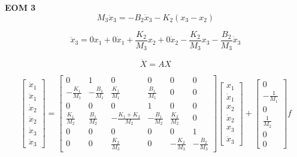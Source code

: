 \documentclass[letterpaper,11pt]{article}
\begin{document}
\noindent \textbf{EOM 3}
\[
M_3 \ddot{x}_3 = -B_2 \dot{x}_3 - K_2(x_3 - x_2)
\]

\[
\ddot{x}_3 = 0   x_1 + 0   \dot{x}_1 + \frac{K_2}{M_3} x_2 + 0   \dot{x}_2 - \frac{K_2}{M_3} x_3 - \frac{B_2}{M_3} \dot{x}_3
\]

\[
\dot{X} = A X
\]

\[
\begin{bmatrix}
\dot{x}_1 \\
\ddot{x}_1 \\
\dot{x}_2 \\
\ddot{x}_2 \\
\dot{x}_3 \\
\ddot{x}_3
\end{bmatrix}
=
\begin{bmatrix}
0 & 1 & 0 & 0 & 0 & 0 \\
-\frac{K_1}{M_1} & -\frac{B_1}{M_1} & \frac{K_1}{M_1} & \frac{B_1}{M_1} & 0 & 0 \\
0 & 0 & 0 & 1 & 0 & 0 \\
\frac{K_1}{M_2} & \frac{B_1}{M_2} & -\frac{K_1+K_2}{M_2} & -\frac{B_1}{M_2} & \frac{K_2}{M_2} & 0 \\
0 & 0 & 0 & 0 & 0 & 1 \\
0 & 0 & \frac{K_2}{M_3} & 0 & -\frac{K_2}{M_3} & -\frac{B_2}{M_3}
\end{bmatrix}
\begin{bmatrix}
x_1 \\
\dot{x}_1 \\
x_2 \\
\dot{x}_2 \\
x_3 \\
\dot{x}_3
\end{bmatrix}
+
\begin{bmatrix}
0 \\
-\frac{1}{M_1} \\
0 \\
\frac{1}{M_2} \\
0 \\
0
\end{bmatrix}
f
\]

%

\newpage




\newpage


\end{document}

